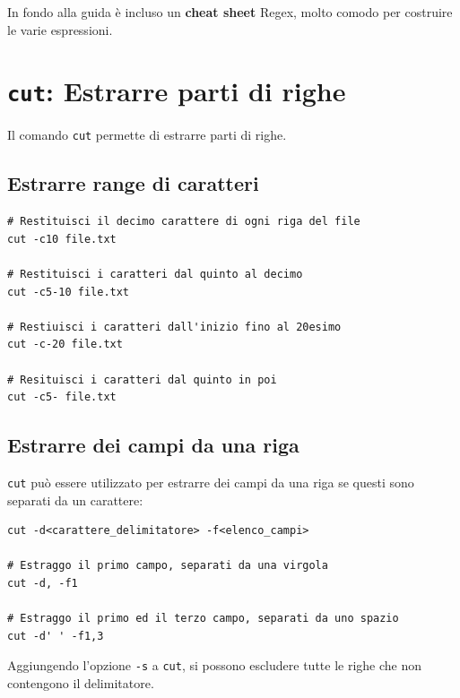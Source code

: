 \documentclass[a4paper]{report}
\newenvironment{info}{\begin{tcolorbox}[fonttitle=\sffamily\bfseries\large,title=Info,colframe=blue!75!white]}{\end{tcolorbox}}
\newenvironment{code}{\begin{tcolorbox}[size=small]}{\end{tcolorbox}}
\begin{document}
\begin{info}
	In fondo alla guida è incluso un \textbf{cheat sheet} Regex, molto comodo per costruire le varie espressioni.
\end{info}

\section{\texttt{cut}: Estrarre parti di righe}

Il comando \texttt{cut} permette di estrarre parti di righe.

\subsection{Estrarre range di caratteri}

\begin{code}
\begin{lstlisting}
# Restituisci il decimo carattere di ogni riga del file
cut -c10 file.txt

# Restituisci i caratteri dal quinto al decimo
cut -c5-10 file.txt

# Restiuisci i caratteri dall'inizio fino al 20esimo
cut -c-20 file.txt

# Resituisci i caratteri dal quinto in poi
cut -c5- file.txt
\end{lstlisting}
\end{code}

\subsection{Estrarre dei campi da una riga}

\texttt{cut} può essere utilizzato per estrarre dei campi da una riga se questi sono separati da un carattere:

\begin{code}
\begin{lstlisting}
cut -d<carattere_delimitatore> -f<elenco_campi>

# Estraggo il primo campo, separati da una virgola
cut -d, -f1

# Estraggo il primo ed il terzo campo, separati da uno spazio
cut -d' ' -f1,3
\end{lstlisting}
\end{code}

\begin{info}
	Aggiungendo l'opzione \texttt{-s} a \texttt{cut}, si possono escludere tutte le righe che non contengono il delimitatore.
\end{info}
\end{document}
